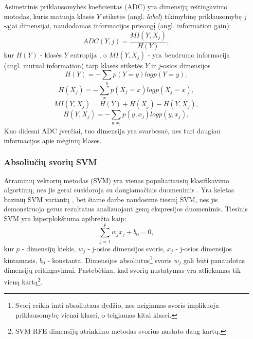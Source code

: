Asimetrinis priklausomybės koeficientas (ADC) yra dimensijų reitingavimo motodas, kuris matuoja klasės $Y$ etiketės (angl. \textit{label}) tikimybinę priklausomybę $j$-ąjai dimensijai, naudodamas informacijos prieaugį \cite{kent1983information} (angl. information gain):
\begin{equation}
 ADC(Y, j) = \frac{MI(Y, X_j)}{H(Y)},
\end{equation}
kur $H(Y)$ - klasės $Y$ entropija \cite{Shannon:2001:MTC:584091.584093}, o $MI(Y, X_j)$ - yra bendrumo informacija \cite{Shannon:2001:MTC:584091.584093} (angl. mutual information) tarp klasės etiketės $Y$ ir $j$-osios dimensijos
\begin{equation}
 H(Y)=-\sum_y{p(Y=y)log{p(Y=y)}}, 
\end{equation}
\begin{equation}
 H(X_j)=-\sum_x{p(X_j=x) log{p(X_j=x)}},
\end{equation}
\begin{equation}
 MI(Y, X_j) = H(Y) + H(X_j) - H(Y, X_j),
\end{equation}
\begin{equation}
 H(Y, X_j) = -\sum_{y,x_j}{p(y, x_j)log{p(y, x_j)}},
\end{equation}
Kuo didesni ADC įverčiai, tuo dimensija yra svarbesnė, nes turi daugiau informacijos apie mėginių klases.

\subsubsection{Absoliučių svorių SVM}

Atraminių vektorių metodas (SVM) yra vienas populiariausių klasifikavimo algortimų, nes jis gerai susidoroja su daugiamačiais duomenimis \cite{guyon2002gene}. Yra keletas bazinių SVM variantų \cite{vapnik2000nature}, bet šiame darbe naudosime tiesinį SVM, nes jis demonstruoja gerus rezultatus analizuojant genų ekspresijos duomenimis. Tiesinis SVM yra hiperplokštuma apibrėžta kaip:
\begin{equation}
 \sum_{j=1}^{p}{w_jx_j + b_0 = 0},
\end{equation}
kur $p$ - dimensijų kiekis, $w_j$ - j-osios dimensijos svoris, $x_j$ - j-osios
dimensijos kintamasis, $b_0$ - konstanta. Dimensijos absoliutus\footnote{Svorį
reikia imti absoliutaus dydžio, nes neigiamas svoris implikuoja priklausomybę 
vienai klasei, o teigiamas kitai klasei.} svoris $w_j$ gali būti panaudotas
dimensijų reitingavimui. Pastebėtina, kad svorių nustatymas yra atliekamas tik 
vieną kartą\footnote{SVM-RFE dimensijų atrinkimo metodas svorius nustato daug kartų.}.


